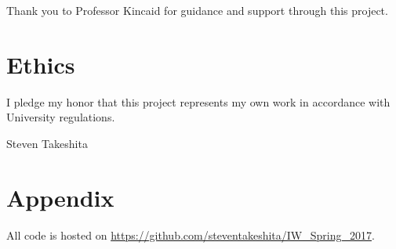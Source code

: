 \documentclass[pageno]{jpaper}
\begin{document}
Thank you to Professor Kincaid for guidance and support through this project. 

\section{Ethics}

I pledge my honor that this project represents my own work in accordance with University regulations.

Steven Takeshita






\section{Appendix}

All code is hosted on \url{https://github.com/steventakeshita/IW_Spring_2017}.
\end{document}
